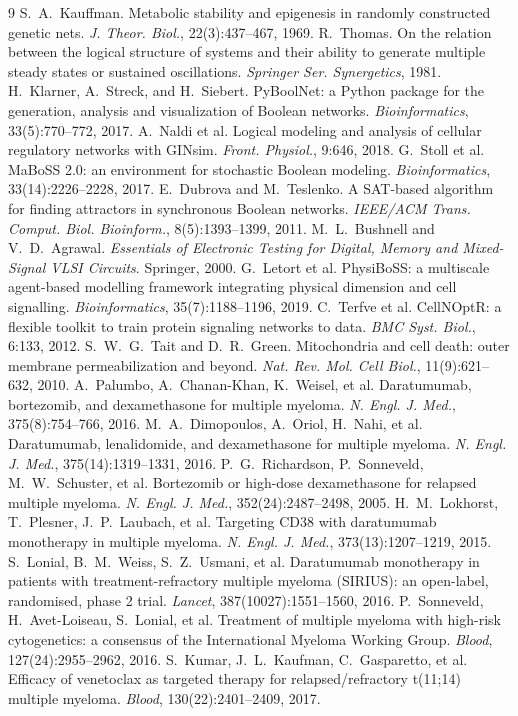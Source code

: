 \documentclass[conference,letterpaper]{IEEEtran}
\begin{document}
\begin{thebibliography}{9}
 S.~A.~Kauffman. Metabolic stability and epigenesis in
randomly constructed genetic nets. \emph{J. Theor. Biol.}, 22(3):437--467, 1969.
 R.~Thomas. On the relation between the logical structure of
systems and their ability to generate multiple steady states or sustained
oscillations. \emph{Springer Ser. Synergetics}, 1981.
 H.~Klarner, A.~Streck, and H.~Siebert. PyBoolNet: a Python
package for the generation, analysis and visualization of Boolean networks.
\emph{Bioinformatics}, 33(5):770--772, 2017.
 A.~Naldi et al. Logical modeling and analysis of cellular
regulatory networks with GINsim. \emph{Front. Physiol.}, 9:646, 2018.
 G.~Stoll et al. MaBoSS 2.0: an environment for stochastic
Boolean modeling. \emph{Bioinformatics}, 33(14):2226--2228, 2017.
 E.~Dubrova and M.~Teslenko. A SAT-based algorithm for finding
attractors in synchronous Boolean networks. \emph{IEEE/ACM Trans. Comput. Biol.
Bioinform.}, 8(5):1393--1399, 2011.
 M.~L.~Bushnell and V.~D.~Agrawal. \emph{Essentials of
Electronic Testing for Digital, Memory and Mixed-Signal VLSI Circuits}.
Springer, 2000.
 G.~Letort et al. PhysiBoSS: a multiscale agent-based
modelling framework integrating physical dimension and cell signalling.
\emph{Bioinformatics}, 35(7):1188--1196, 2019.
 C.~Terfve et al. CellNOptR: a flexible toolkit to train
protein signaling networks to data. \emph{BMC Syst. Biol.}, 6:133, 2012.
 S.~W.~G.~Tait and D.~R.~Green. Mitochondria and cell death:
outer membrane permeabilization and beyond. \emph{Nat. Rev. Mol. Cell Biol.},
11(9):621--632, 2010.
 A.~Palumbo, A.~Chanan-Khan, K.~Weisel, et al. Daratumumab,
bortezomib, and dexamethasone for multiple myeloma. \emph{N. Engl. J. Med.},
375(8):754--766, 2016.
 M.~A.~Dimopoulos, A.~Oriol, H.~Nahi, et al. Daratumumab,
lenalidomide, and dexamethasone for multiple myeloma. \emph{N. Engl. J. Med.},
375(14):1319--1331, 2016.
 P.~G.~Richardson, P.~Sonneveld, M.~W.~Schuster, et al. Bortezomib
or high-dose dexamethasone for relapsed multiple myeloma. \emph{N. Engl. J.
Med.}, 352(24):2487--2498, 2005.
 H.~M.~Lokhorst, T.~Plesner, J.~P.~Laubach, et al. Targeting CD38
with daratumumab monotherapy in multiple myeloma. \emph{N. Engl. J. Med.},
373(13):1207--1219, 2015.
 S.~Lonial, B.~M.~Weiss, S.~Z.~Usmani, et al. Daratumumab
monotherapy in patients with treatment-refractory multiple myeloma (SIRIUS): an
open-label, randomised, phase 2 trial. \emph{Lancet}, 387(10027):1551--1560,
2016.
 P.~Sonneveld, H.~Avet-Loiseau, S.~Lonial, et al. Treatment of
multiple myeloma with high-risk cytogenetics: a consensus of the International
Myeloma Working Group. \emph{Blood}, 127(24):2955--2962, 2016.
 S.~Kumar, J.~L.~Kaufman, C.~Gasparetto, et al. Efficacy of
venetoclax as targeted therapy for relapsed/refractory t(11;14) multiple
myeloma. \emph{Blood}, 130(22):2401--2409, 2017.

\end{thebibliography}
\end{document}
